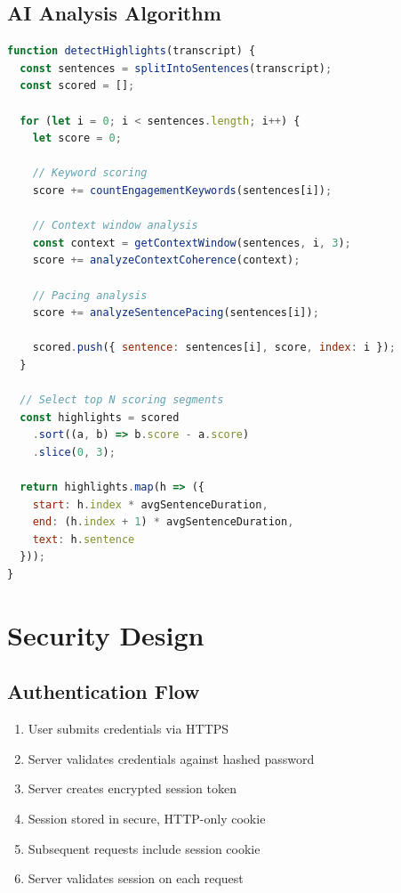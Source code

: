 \subsection{AI Analysis Algorithm}

\begin{lstlisting}[language=JavaScript, caption=Highlight Detection Pseudocode]
function detectHighlights(transcript) {
  const sentences = splitIntoSentences(transcript);
  const scored = [];
  
  for (let i = 0; i < sentences.length; i++) {
    let score = 0;
    
    // Keyword scoring
    score += countEngagementKeywords(sentences[i]);
    
    // Context window analysis
    const context = getContextWindow(sentences, i, 3);
    score += analyzeContextCoherence(context);
    
    // Pacing analysis
    score += analyzeSentencePacing(sentences[i]);
    
    scored.push({ sentence: sentences[i], score, index: i });
  }
  
  // Select top N scoring segments
  const highlights = scored
    .sort((a, b) => b.score - a.score)
    .slice(0, 3);
  
  return highlights.map(h => ({
    start: h.index * avgSentenceDuration,
    end: (h.index + 1) * avgSentenceDuration,
    text: h.sentence
  }));
}
\end{lstlisting}

\section{Security Design}

\subsection{Authentication Flow}

\begin{enumerate}
    \item User submits credentials via HTTPS
    \item Server validates credentials against hashed password
    \item Server creates encrypted session token
    \item Session stored in secure, HTTP-only cookie
    \item Subsequent requests include session cookie
    \item Server validates session on each request
\end{enumerate}

